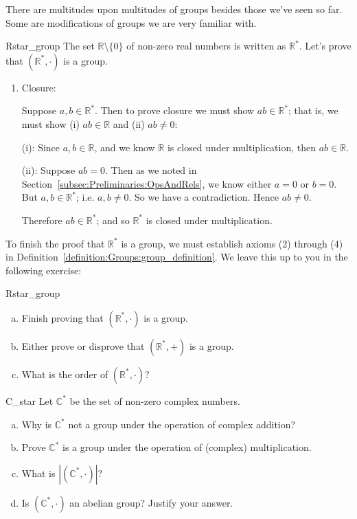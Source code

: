 There are multitudes upon multitudes of groups besides those we've seen so far.  Some are modifications of groups we are very familiar with.  

\begin{example}{Rstar_group}
The set ${\mathbb R} \setminus \{0 \}$ of non-zero real numbers is written as ${\mathbb R}^{\ast}$.  Let's prove that $({\mathbb R}^{\ast}, \cdot)$ is a group.
\begin{enumerate}[(1)]
\item
Closure:  

\noindent
Suppose $a, b \in {\mathbb R}^{\ast}$.  Then to prove closure we must show $ab \in {\mathbb R}^{\ast}$; that is, we must show (i)
$ab \in {\mathbb R}$ and (ii) $ab \neq 0$:

\medskip{}
\noindent
(i):  Since $a, b \in {\mathbb R}$, and we know ${\mathbb R}$ is closed under multiplication, then $ab \in {\mathbb R}$.

\medskip{}
\noindent
(ii):  Suppose $ab = 0$.  Then as we  noted in Section~\ref{subsec:Preliminaries:OpsAndRels}, we know either $a = 0$ or $b = 0$.  But $a, b \in {\mathbb R}^{\ast}$; i.e. $a, b \neq 0$.  So we have a contradiction.  Hence $ab \neq 0$.

\medskip{}
\noindent
Therefore $ab \in {\mathbb R}^{\ast}$; and so ${\mathbb R}^{\ast}$  is closed under multiplication.
\end{enumerate}
To finish the proof that ${\mathbb R}^{\ast}$ is a group, we must establish axioms (2) through (4) in Definition~\ref{definition:Groups:group_definition}. We leave this up to you in the following exercise:

\begin{exercise}{Rstar_group} 
\begin{enumerate}[(a)]
\item
Finish proving that $({\mathbb R}^{\ast}, \cdot)$ is a group.
\item
Either prove or disprove that $({\mathbb R}^{\ast}, +)$ is a group.
\item
What is the order of $({\mathbb R}^{\ast}, \cdot)$?
\end{enumerate}
\end{exercise}
  \end{example}


\begin{exercise}{C_star}
Let ${\mathbb C}^{\ast} $\label{noteCstar} be the set of non-zero complex 
numbers. 
\begin{enumerate}[(a)]
\item
Why is ${\mathbb C}^{\ast}$ not a group under the operation of complex addition?
\item
Prove ${\mathbb C}^{\ast}$ is a group under the operation of (complex) multiplication.
\item
What is $| ({\mathbb C}^{\ast}, \cdot) |$?
\item
Is $({\mathbb C}^{\ast}, \cdot)$ an abelian group?  Justify your answer.
\end{enumerate}  
\end{exercise}

